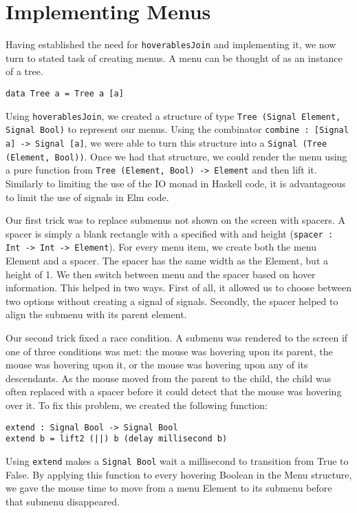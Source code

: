\documentclass{article}
\begin{document}
\section{Implementing Menus}\label{implementing-menus}

Having established the need for \texttt{hoverablesJoin} and implementing it, we
now turn to stated task of creating menus. A menu can be thought of as an
instance of a tree.

\texttt{data Tree a = Tree a [a]}

Using \texttt{hoverablesJoin}, we created a structure of type
\texttt{Tree (Signal Element, Signal Bool)} to represent our menus.
Using the combinator
\texttt{combine : {[}Signal a{]} -\textgreater{} Signal {[}a{]}}, we
were able to turn this structure into a
\texttt{Signal (Tree (Element, Bool))}. Once we had that structure, we
could render the menu using a pure function from
\texttt{Tree (Element, Bool) -\textgreater{} Element} and then lift it.
Similarly to limiting the use of the IO monad in Haskell code, it is
advantageous to limit the use of signals in Elm code.

Our first trick was to replace submenus not shown on the screen with
spacers. A spacer is simply a blank rectangle with a specified with and
height
(\texttt{spacer : Int -\textgreater{} Int -\textgreater{} Element}). For
every menu item, we create both the menu Element and a spacer. The
spacer has the same width as the Element, but a height of 1. We then
switch between menu and the spacer based on hover information. This
helped in two ways. First of all, it allowed us to choose between two
options without creating a signal of signals. Secondly, the spacer
helped to align the submenu with its parent element.

Our second trick fixed a race condition. A submenu was rendered to the
screen if one of three conditions was met: the mouse was hovering upon
its parent, the mouse was hovering upon it, or the mouse was hovering
upon any of its descendants. As the mouse moved from the parent to the
child, the child was often replaced with a spacer before it could detect
that the mouse was hovering over it. To fix this problem, we created the
following function:

\begin{verbatim}
extend : Signal Bool -> Signal Bool
extend b = lift2 (||) b (delay millisecond b)
\end{verbatim}

Using \texttt{extend} makes a \texttt{Signal Bool} wait a millisecond to
transition from True to False. By applying this function to every
hovering Boolean in the Menu structure, we gave the mouse time to move
from a menu Element to its submenu before that submenu disappeared.
\end{document}
